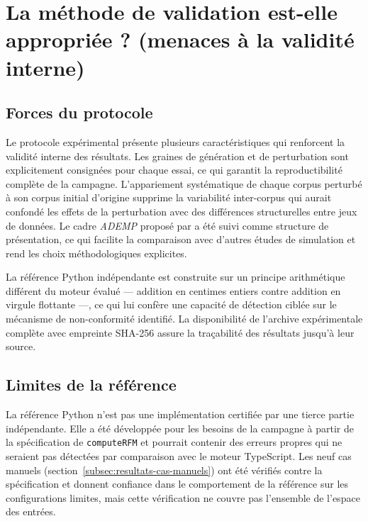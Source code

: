\section{La méthode de validation est-elle appropriée ? (menaces à la validité interne)}
\label{sec:disc-validite-interne}

\subsection{Forces du protocole}
\label{subsec:disc-vi-forces}

Le protocole expérimental présente plusieurs caractéristiques qui renforcent la validité
interne des résultats. Les graines de génération et de perturbation sont explicitement
consignées pour chaque essai, ce qui garantit la reproductibilité complète de la campagne.
L'appariement systématique de chaque corpus perturbé à son corpus initial d'origine supprime
la variabilité inter-corpus qui aurait confondé les effets de la perturbation avec des
différences structurelles entre jeux de données. Le cadre \emph{ADEMP} proposé par
\citet{Morris2019} a été suivi comme structure de présentation, ce qui facilite la
comparaison avec d'autres études de simulation et rend les choix méthodologiques explicites.

La référence Python indépendante est construite sur un principe arithmétique différent du
moteur évalué — addition en centimes entiers contre addition en virgule flottante —, ce qui
lui confère une capacité de détection ciblée sur le mécanisme de non-conformité identifié.
La disponibilité de l'archive expérimentale complète avec empreinte SHA-256 \citep{ViannaFilho2026}
assure la traçabilité des résultats jusqu'à leur source.

\subsection{Limites de la référence}
\label{subsec:disc-vi-limites-ref}

La référence Python n'est pas une implémentation certifiée par une tierce partie indépendante.
Elle a été développée pour les besoins de la campagne à partir de la spécification de
\texttt{computeRFM} et pourrait contenir des erreurs propres qui ne seraient pas détectées
par comparaison avec le moteur TypeScript. Les neuf cas manuels (section~\ref{subsec:resultats-cas-manuels})
ont été vérifiés contre la spécification et donnent confiance dans le comportement de la
référence sur les configurations limites, mais cette vérification ne couvre pas l'ensemble de
l'espace des entrées.

